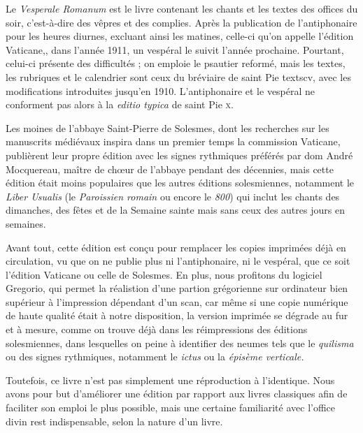 
\begin{frpars}
Le \textit{Vesperale Romanum} est le livre contenant les chants et les textes des offices du soir, c’est-à-dire des vêpres et des complies. Après la publication de l'antiphonaire pour les heures diurnes, excluant ainsi les matines, celle-ci qu'on appelle l'édition Vaticane,, dans l'année 1911, un vespéral le suivit l'année prochaine. Pourtant, celui-ci présente des difficultés ; on emploie le psautier reformé, mais les textes, les rubriques et le calendrier sont ceux du bréviaire de saint Pie textsc{v}, avec les modifications introduites jusqu'en 1910. L'antiphonaire et le vespéral ne conforment pas alors à la \textit{editio typica} de saint Pie \textsc{x}.

Les moines de l'abbaye Saint-Pierre de Solesmes, dont les recherches sur les manuscrits médiévaux inspira dans un premier temps la commission Vaticane, publièrent leur propre édition avec les signes rythmiques préférés par dom André Mocquereau, maître de chœur de l'abbaye pendant des décennies, mais cette édition était moins populaires que les autres éditions solesmiennes, notamment le \textit{Liber Usualis} (le \textit{Paroissien romain} ou encore le \textit{800}) qui inclut les chants des dimanches, des fêtes et de la Semaine sainte mais sans ceux des autres jours en semaines.


Avant tout, cette édition est conçu pour remplacer les copies imprimées déjà en circulation, vu que on ne publie plus ni l'antiphonaire, ni le vespéral, que ce soit l'édition Vaticane ou celle de Solesmes. En plus, nous profitons du logiciel Gregorio, qui permet la réalistion d'une partion grégorienne sur ordinateur bien supérieur à l'impression dépendant d'un scan, car même si une copie numérique de haute qualité était à notre disposition, la version imprimée se dégrade au fur et à mesure, comme on trouve déjà dans les réimpressions des éditions solesmiennes, dans lesquelles on peine à identifier des neumes tels que le \textit{quilisma} ou des signes rythmiques, notamment le \textit{ictus} ou la \textit{épisème verticale.}

Toutefois, ce livre n'est pas simplement une réproduction à l'identique. Nous avons pour but d'améliorer une édition par rapport aux livres classiques afin de faciliter son emploi le plus possible, mais une certaine familiarité avec l'office divin rest indispensable, selon la nature d'un livre.


\end{frpars}
